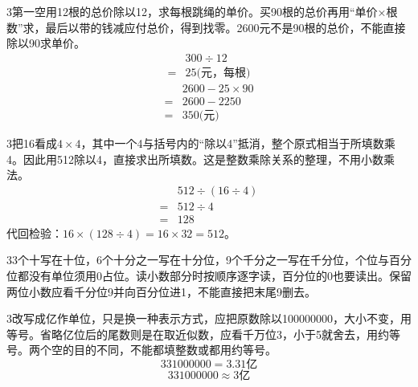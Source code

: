 \documentclass[multi=snippet,border={5bp 20bp 5bp 5bp}]{standalone}
\newenvironment{snippet}[3]{\begin{minipage}{#1bp}\color{answerred}\fontsize{#2}{#3}\selectfont\raggedright}{\end{minipage}}
\begin{document}
\begin{snippet}{505}{11.5}{14}\begin{multicols}{3}\raggedcolumns 第一空用12根的总价除以12，求每根跳绳的单价。买90根的总价再用“单价×根数”求，最后以带的钱减应付总价，得到找零。2600元不是90根的总价，不能直接除以90求单价。\[\begin{aligned}&300\div12\\={}&25\text{(元，每根)}\end{aligned}\]\[\begin{aligned}&2600-25\times90\\={}&2600-2250\\={}&350\text{(元)}\end{aligned}\]\end{multicols}\end{snippet}
\begin{snippet}{505}{11.5}{14}\begin{multicols}{3}\raggedcolumns 把16看成\(4\times4\)\allowbreak ，其中一个4与括号内的“除以4”抵消，整个原式相当于所填数乘4。因此用512除以4，直接求出所填数。这是整数乘除关系的整理，不用小数乘法。\[\begin{aligned}&512\div(16\div4)\\={}&512\div4\\={}&128\end{aligned}\]代回检验：\(16\times(128\div4)=16\times32=512\)\allowbreak 。\end{multicols}\end{snippet}
\begin{snippet}{505}{11.5}{14}\begin{multicols}{3}\raggedcolumns 3个十写在十位，6个十分之一写在十分位，9个千分之一写在千分位，个位与百分位都没有单位须用0占位。读小数部分时按顺序逐字读，百分位的0也要读出。保留两位小数应看千分位9并向百分位进1，不能直接把末尾9删去。\end{multicols}\end{snippet}
\begin{snippet}{505}{11.5}{14}\begin{multicols}{3}\raggedcolumns 改写成亿作单位，只是换一种表示方式，应把原数除以100000000，大小不变，用等号。省略亿位后的尾数则是在取近似数，应看千万位3，小于5就舍去，用约等号。两个空的目的不同，不能都填整数或都用约等号。\[331000000=3.31\text{亿}\]\[331000000\approx3\text{亿}\]\end{multicols}\end{snippet}
\end{document}
